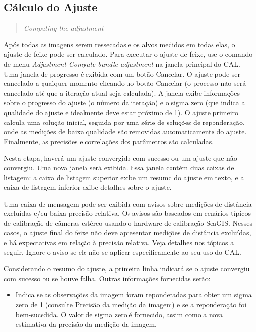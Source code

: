 \documentclass[
  12pt,
  letterpaper,
  DIV=11,
  numbers=noendperiod]{scrreprt}
\providecommand{\tightlist}{%
  \setlength{\itemsep}{0pt}\setlength{\parskip}{0pt}}
\begin{document}
\subsection{Cálculo do Ajuste}\label{sec-cal-ajuste}

\begin{quote}
\emph{Computing the adjustment}
\end{quote}

Após todas as imagens serem ressecadas e os alvos medidos em todas elas,
o ajuste de feixe pode ser calculado. Para executar o ajuste de feixe,
use o comando de menu \emph{Adjustment \textbar{} Compute bundle
adjustment} na janela principal do CAL. Uma janela de progresso é
exibida com um botão Cancelar. O ajuste pode ser cancelado a qualquer
momento clicando no botão Cancelar (o processo não será cancelado até
que a iteração atual seja calculada). A janela exibe informações sobre o
progresso do ajuste (o número da iteração) e o sigma zero (que indica a
qualidade do ajuste e idealmente deve estar próximo de 1). O ajuste
primeiro calcula uma solução inicial, seguida por uma série de soluções
de reponderação, onde as medições de baixa qualidade são removidas
automaticamente do ajuste. Finalmente, as precisões e correlações dos
parâmetros são calculadas.

Nesta etapa, haverá um ajuste convergido com sucesso ou um ajuste que
não convergiu. Uma nova janela será exibida. Essa janela contém duas
caixas de listagem: a caixa de listagem superior exibe um resumo do
ajuste em texto, e a caixa de listagem inferior exibe detalhes sobre o
ajuste.

Uma caixa de mensagem pode ser exibida com avisos sobre medições de
distância excluídas e/ou baixa precisão relativa. Os avisos são baseados
em cenários típicos de calibração de câmeras estéreo usando o hardware
de calibração SeaGIS. Nesses casos, o ajuste final do feixe não deve
apresentar medições de distância excluídas, e há expectativas em relação
à precisão relativa. Veja detalhes nos tópicos a seguir. Ignore o aviso
se ele não se aplicar especificamente ao seu uso do CAL.

Considerando o resumo do ajuste, a primeira linha indicará se o ajuste
convergiu com sucesso ou se houve falha. Outras informações fornecidas
serão:

\begin{itemize}
\tightlist
\item
  Indica se as observações da imagem foram reponderadas para obter um
  sigma zero de 1 (consulte Precisão da medição da imagem) e se a
  reponderação foi bem-sucedida. O valor de sigma zero é fornecido,
  assim como a nova estimativa da precisão da medição da imagem.
\end{itemize}
\end{document}
